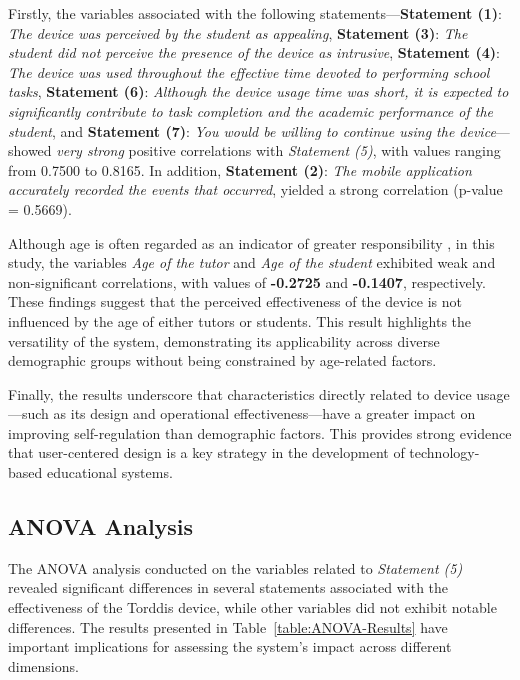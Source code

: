                 Firstly, the variables associated with the following statements—\textbf{Statement (1)}: \textit{The device was perceived by the student as appealing}, \textbf{Statement (3)}: \textit{The student did not perceive the presence of the device as intrusive}, \textbf{Statement (4)}: \textit{The device was used throughout the effective time devoted to performing school tasks}, \textbf{Statement (6)}: \textit{Although the device usage time was short, it is expected to significantly contribute to task completion and the academic performance of the student}, and \textbf{Statement (7)}: \textit{You would be willing to continue using the device}—showed \textit{very strong} positive correlations with \textit{Statement (5)}, with values ranging from 0.7500 to 0.8165. In addition, \textbf{Statement (2)}: \textit{The mobile application accurately recorded the events that occurred}, yielded a strong correlation (p-value = 0.5669).
                
                Although age is often regarded as an indicator of greater responsibility \citep{Moss2018Why}, in this study, the variables \textit{Age of the tutor} and \textit{Age of the student} exhibited weak and non-significant correlations, with values of \textbf{-0.2725} and \textbf{-0.1407}, respectively. These findings suggest that the perceived effectiveness of the device is not influenced by the age of either tutors or students. This result highlights the versatility of the system, demonstrating its applicability across diverse demographic groups without being constrained by age-related factors.
                
                Finally, the results underscore that characteristics directly related to device usage—such as its design and operational effectiveness—have a greater impact on improving self-regulation than demographic factors. This provides strong evidence that user-centered design is a key strategy in the development of technology-based educational systems.
                
                \subsection{ANOVA Analysis}
                The ANOVA analysis conducted on the variables related to \textit{Statement (5)} revealed significant differences in several statements associated with the effectiveness of the Torddis device, while other variables did not exhibit notable differences. The results presented in Table~\ref{table:ANOVA-Results} have important implications for assessing the system's impact across different dimensions.
                
